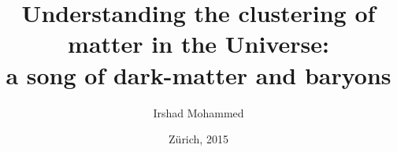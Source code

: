 


\title{Understanding the clustering of matter in the Universe: \\
a song of dark-matter and baryons}

\author{Irshad Mohammed}






\date{Z\"urich, 2015}


